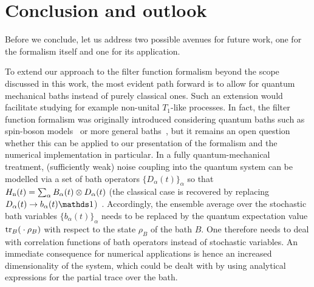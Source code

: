 \chapter{Conclusion and outlook}\label{ch:ff:conclusion}
Before we conclude, let us address two possible avenues for future work, one for the formalism itself and one for its application.

To extend our approach to the filter function formalism beyond the scope discussed in this work, the most evident path forward is to allow for quantum mechanical baths instead of purely classical ones.
Such an extension would facilitate studying for example non-unital $T_1$-like processes.
In fact, the filter function formalism was originally introduced considering quantum baths such as spin-boson models~\cite{Martinis2003,Uhrig2007} or more general baths~\cite{Kofman2001,Yuge2011,Paz-Silva2017}, but it remains an open question whether this can be applied to our presentation of the formalism and the numerical implementation in particular.
In a fully quantum-mechanical treatment, (sufficiently weak) noise coupling into the quantum system can be modelled via a set of bath operators $\{D_\alpha(t)\}_\alpha$ so that $H_{\mathrm{n}}(t) = \sum_\alpha B_\alpha(t)\otimes D_\alpha(t)$ (the classical case is recovered by replacing $D_\alpha(t)\rightarrow b_\alpha(t)\eye$)~\cite{Breuer2007}.
Accordingly, the ensemble average over the stochastic bath variables $\{b_\alpha(t)\}_\alpha$ needs to be replaced by the quantum expectation value $\tr_B(\:\cdot\:\rho_B)$ with respect to the state $\rho_B$ of the bath $B$.
One therefore needs to deal with correlation functions of bath operators instead of stochastic variables.
An immediate consequence for numerical applications is hence an increased dimensionality of the system, which could be dealt with by using analytical expressions for the partial trace over the bath.


